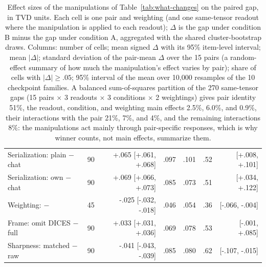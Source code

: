 \begin{table}[t]
\begin{tabular}{@{}lrrrrrr@{}}
Serialization: plain $-$ chat & 90 & +.065 [+.061, +.068] & .097 & .101 & .52 & [+.008, +.101] \\
Serialization: own $-$ chat & 90 & +.069 [+.066, +.073] & .085 & .073 & .51 & [+.034, +.122] \\
Weighting: \PC{} $-$ \ES{} & 45 & -.025 [-.032, -.018] & .046 & .054 & .36 & [-.066, -.004] \\
Frame: omit DICES $-$ full & 90 & +.033 [+.031, +.036] & .069 & .078 & .53 & [-.001, +.085] \\
Sharpness: matched $-$ raw & 90 & -.041 [-.043, -.039] & .085 & .080 & .62 & [-.107, -.015] \\
\bottomrule
\end{tabular}
\caption{Effect sizes of the manipulations of Table~\ref{tab:what-changes} on the paired gap, in TVD units. Each cell is one pair and weighting (and one same-tensor readout where the manipulation is applied to each readout); $\Delta$ is the gap under condition B minus the gap under condition A, aggregated with the shared cluster-bootstrap draws. Columns: number of cells; mean signed $\Delta$ with its 95\% item-level interval; mean $|\Delta|$; standard deviation of the pair-mean $\Delta$ over the 15 pairs (a random-effect summary of how much the manipulation's effect varies by pair); share of cells with $|\Delta|\ge.05$; 95\% interval of the mean over 10,000 resamples of the 10 checkpoint families. A balanced sum-of-squares partition of the 270 same-tensor gaps (15 pairs $\times$ 3 readouts $\times$ 3 conditions $\times$ 2 weightings) gives pair identity 51\%, the readout, condition, and weighting main effects 2.5\%, 6.0\%, and 0.9\%, their interactions with the pair 21\%, 7\%, and 4\%, and the remaining interactions 8\%: the manipulations act mainly through pair-specific responses, which is why winner counts, not main effects, summarize them.}
\label{tab:effect-sizes}
\end{table}
